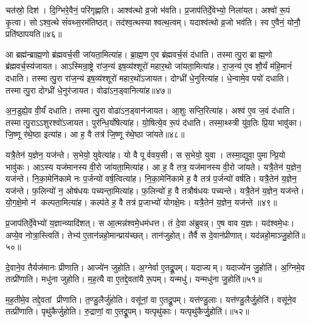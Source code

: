 चत॑स्रो॒ दिश॑। दि॒ग्भिरे॒वैनं॒ परि॑गृह्णाति। आश्व॑त्थो व्र॒जो भ॑वति। प्र॒जाप॑तिर्दे॒वेभ्यो॒ निला॑यत। अश्वो॑ रू॒पं कृ॒त्वा। सोऽश्व॒त्थे सं॑वथ्स॒रम॑तिष्ठत्। तद॑श्व॒त्थस्याश्वत्थ॒त्वम्। यदाश्व॑त्थो व्र॒जो भव॑ति। स्व ए॒वैनं॒ योनौ॒ प्रति॑ष्ठापयति॥४६॥\anuvakamend[त्रि॒ष्टुभ॒श्छन्द॒सोऽधि॒ निर्मि॑मीते जुहोति॒ नव॑ च]

आ ब्रह्म॑न्ब्राह्म॒णो ब्र॑ह्मवर्च॒सी जा॑यता॒मित्या॑ह। ब्रा॒ह्म॒ण ए॒व ब्र॑ह्मवर्च॒सं द॑धाति। तस्मात्पु॒रा ब्राह्म॒णो ब्र॑ह्मवर्च॒स्य॑जायत। आऽस्मिन्रा॒ष्ट्रे रा॑ज॒न्य॑ इष॒व्य॑श्शूरो॑ महार॒थो जा॑यता॒मित्या॑ह। रा॒ज॒न्य॑ ए॒व शौ॒र्यं म॑हि॒मानं॑ दधाति। तस्मात्पु॒रा रा॑ज॒न्य॑ इष॒व्य॑श्शूरो॑ महार॒थो॑ऽजायत। दोग्ध्री॑ धे॒नुरित्या॑ह। धे॒न्वामे॒व पयो॑ दधाति। तस्मात्पु॒रा दोग्ध्री॑ धे॒नुर॑जायत। वोढा॑ऽन॒ड्वानित्या॑ह॥४७॥

अ॒न॒डुह्ये॒व वी॒र्यं॑ दधाति। तस्मात्पु॒रा वोढा॑ऽन॒ड्वान॑जायत। आ॒शुः सप्ति॒रित्या॑ह। अश्व॑ ए॒व ज॒वं द॑धाति। तस्मात्पु॒राऽऽशुरश्वो॑ऽजायत। पुर॑न्धि॒र्योषेत्या॑ह। यो॒षित्ये॒व रू॒पं द॑धाति। तस्मा॒थ्स्त्री यु॑व॒तिः प्रि॒या भावु॑का। जि॒ष्णू र॑थे॒ष्ठा इत्या॑ह। आ ह॒ वै तत्र॑ जि॒ष्णू र॑थे॒ष्ठा जा॑यते॥४८॥

यत्रै॒तेन॑ य॒ज्ञेन॒ यज॑न्ते। स॒भेयो॒ युवेत्या॑ह। यो वै पूर्ववय॒सी। स स॒भेयो॒ युवा। तस्मा॒द्युवा॒ पुमान्प्रि॒यो भावु॑कः। आऽस्य यज॑मानस्य वी॒रो जा॑यता॒मित्या॑ह। आ ह॒ वै तत्र॒ यज॑मानस्य वी॒रो जा॑यते। यत्रै॒तेन॑ य॒ज्ञेन॒ यज॑न्ते। नि॒का॒मेनि॑कामे नः प॒र्जन्यो॑ वर्\mbox{}ष॒त्वित्या॑ह। नि॒का॒मेनि॑कामे ह॒ वै तत्र॑ प॒र्जन्यो॑ वर्\mbox{}षति। यत्रै॒तेन॑ य॒ज्ञेन॒ यज॑न्ते। फ॒लिन्यो॑ न॒ ओष॑धयः पच्यन्ता॒मित्या॑ह। फ॒लिन्यो॑ ह॒ वै तत्रौष॑धयः पच्यन्ते। यत्रै॒तेन॑ य॒ज्ञेन॒ यज॑न्ते। यो॒ग॒क्षे॒मो न॑ कल्पता॒मित्या॑ह। कल्प॑ते ह॒ वै तत्र॑ प्र॒जाभ्यो॑ योगक्षे॒मः। यत्रै॒तेन॑ य॒ज्ञेन॒ यज॑न्ते ॥४९॥\anuvakamend[अ॒न॒ड्वानित्या॑ह जायते वर्‌षति स॒प्त च॑]

प्र॒जाप॑तिर्दे॒वेभ्यो॑ य॒ज्ञान्व्यादि॑शत्। स आ॒त्मन्न॑श्वमे॒धम॑धत्त। तं दे॒वा अ॑ब्रुवन्न्। ए॒ष वाव य॒ज्ञः। यद॑श्वमे॒धः। अप्ये॒व नोत्रा॒स्त्विति॑। तेभ्य॑ ए॒तान॑न्नहो॒मान्प्राय॑च्छत्। तान॑जुहोत्। तैर्वै स दे॒वान॑प्रीणात्। यद॑न्नहो॒माञ्जु॒होति॑॥५०॥

दे॒वाने॒व तैर्यज॑मानः प्रीणाति। आज्ये॑न जुहोति। अ॒ग्नेर्वा ए॒तद्रू॒पम्। यदाज्यम्। यदाज्ये॑न जु॒होति॑। अ॒ग्निमे॒व तत्प्री॑णाति। मधु॑ना जुहोति। म॒ह॒त्यै वा ए॒तद्दे॒वता॑यै रू॒पम्। यन्मधु॑। यन्मधु॑ना जु॒होति॑॥५१॥

म॒ह॒तीमे॒व तद्दे॒वतां प्रीणाति। त॒ण्डु॒लैर्जु॑होति। वसू॑नां॒ वा ए॒तद्रू॒पम्। यत्त॑ण्डु॒लाः। यत्त॑ण्डु॒लैर्जु॒होति॑। वसू॑ने॒व तत्प्री॑णाति। पृथु॑कैर्जुहोति। रु॒द्राणां॒ वा ए॒तद्रू॒पम्। यत्पृथु॑काः। यत्पृथु॑कैर्जु॒होति॑।॥५२॥

